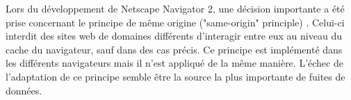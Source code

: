 Lors du développement de Netscape Navigator 2, une décision importante a été prise concernant le principe de même origine ("same-origin" principle) \cite{Jackson:2006:PBS:1135777.1135884}. Celui-ci interdit des sites web de domaines différents d'interagir entre eux au niveau du cache du navigateur, sauf dans des cas précis. Ce principe est implémenté dans les différents navigateurs mais il n'est appliqué de la même manière. L'échec de l'adaptation de ce principe semble être la source la plus importante de fuites de données.

